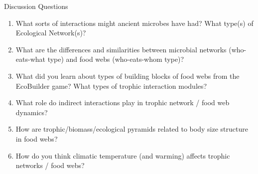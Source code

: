 \begin{frame}{Discussion Questions}

  \begin{enumerate}\setlength{\itemindent}{-2em}\itemsep4pt
  
    \item What sorts of interactions might ancient microbes have had? What type(s) of Ecological Network(s)? 

    \item What are the differences and similarities between microbial networks (who-eats-what type) and food webs (who-eats-whom type)? 

    \item What did you learn about types of building blocks of food webs from the EcoBuilder game? What types of trophic interaction modules?
    
    \item What role do indirect interactions play in trophic network / food web dynamics?

    \item How are trophic/biomass/ecological pyramids related to body size structure in food webs?

    \item How do you think climatic temperature (and warming) affects trophic networks / food webs? 

  \end{enumerate}

\end{frame}


